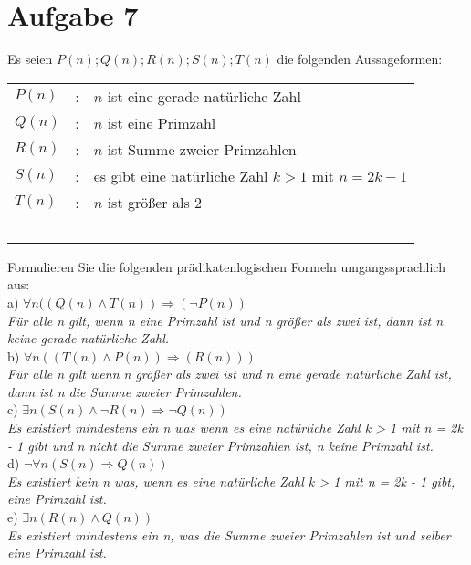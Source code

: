 \section*{Aufgabe 7}

Es seien $P(n); Q(n); R(n); S(n); T(n)$ die folgenden Aussageformen:\\

\begin{tabular}{lcl}
$P(n)$ & : & $n$ ist eine gerade natürliche Zahl\\
$Q(n)$ & : & $n$ ist eine Primzahl\\
$R(n)$ & : & $n$ ist Summe zweier Primzahlen\\
$S(n)$ & : & es gibt eine natürliche Zahl $k > 1$ mit $n = 2k - 1$\\
$T(n)$ & : & $n$ ist größer als $2$\\~\\
\end{tabular}

Formulieren Sie die folgenden prädikatenlogischen Formeln umgangssprachlich aus:\\

a) $\forall n ((Q(n) \land T(n)) \Rightarrow (\lnot P(n))$\\

\textit{Für alle n gilt, wenn n eine Primzahl ist und n größer als zwei ist, dann ist n keine gerade natürliche Zahl.}\\

b) $\forall n ((T(n) \land P(n)) \Rightarrow (R(n)))$\\

\textit{Für alle n gilt wenn n größer als zwei ist und n eine gerade natürliche Zahl ist, dann ist n die Summe zweier Primzahlen.}\\

c) $\exists n (S(n) \land \lnot R(n) \Rightarrow \lnot Q(n))$\\

\textit{Es existiert mindestens ein n was wenn es eine natürliche Zahl k > 1 mit n = 2k - 1 gibt und n nicht die Summe zweier Primzahlen ist, n keine Primzahl ist.}\\

d) $\lnot \forall n (S(n) \Rightarrow Q(n))$\\

\textit{Es existiert kein n was, wenn es eine natürliche Zahl k > 1 mit n = 2k - 1 gibt, eine Primzahl ist.}\\

e) $\exists n (R(n) \land Q(n))$\\

\textit{Es existiert mindestens ein n, was die Summe zweier Primzahlen ist und selber eine Primzahl ist.}